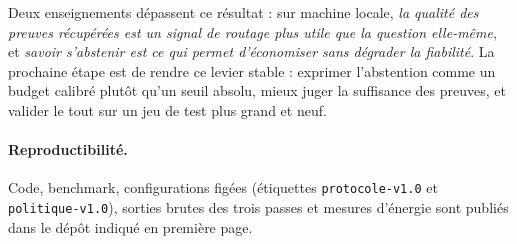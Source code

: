 \documentclass[11pt,a4paper]{article}
\begin{document}
Deux enseignements dépassent ce résultat : sur machine locale, \emph{la qualité des preuves récupérées
est un signal de routage plus utile que la question elle-même}, et \emph{savoir s'abstenir est ce qui
permet d'économiser sans dégrader la fiabilité}. La prochaine étape est de rendre ce levier stable :
exprimer l'abstention comme un budget calibré plutôt qu'un seuil absolu, mieux juger la suffisance des
preuves, et valider le tout sur un jeu de test plus grand et neuf.

\paragraph{Reproductibilité.} Code, benchmark, configurations figées (étiquettes \texttt{protocole-v1.0}
et \texttt{politique-v1.0}), sorties brutes des trois passes et mesures d'énergie sont publiés dans le
dépôt indiqué en première page.



\end{document}
